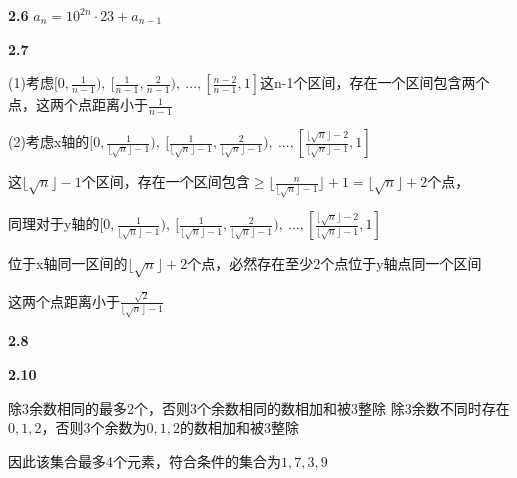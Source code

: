 \vspace{5mm} %
\noindent{}\textbf{2.6}
$a_n=10^{2n}\cdot23+a_{n-1}$

\vspace{5mm} %
\noindent{}\textbf{2.7}

(1)考虑$[0,\frac{1}{n-1}),\ [\frac{1}{n-1},\frac{2}{n-1}),\ ...,[\frac{n-2}{n-1},1]$这n-1个区间，存在一个区间包含两个点，这两个点距离小于$\frac{1}{n-1}$

(2)考虑x轴的$[0,\frac{1}{\lfloor\sqrt{n}\rfloor-1}),\ [\frac{1}{\lfloor\sqrt{n}\rfloor-1},\frac{2}{\lfloor\sqrt{n}\rfloor-1}),\ ...,[\frac{\lfloor\sqrt{n}\rfloor-2}{\lfloor\sqrt{n}\rfloor-1},1]$

这$\lfloor\sqrt{n}\rfloor-1$个区间，存在一个区间包含$\geq \lfloor\frac{n}{\lfloor\sqrt{n}\rfloor-1}\rfloor+1=\lfloor\sqrt{n}\rfloor+2$个点，

同理对于y轴的$[0,\frac{1}{\lfloor\sqrt{n}\rfloor-1}),\ [\frac{1}{\lfloor\sqrt{n}\rfloor-1},\frac{2}{\lfloor\sqrt{n}\rfloor-1}),\ ...,[\frac{\lfloor\sqrt{n}\rfloor-2}{\lfloor\sqrt{n}\rfloor-1},1]$

位于x轴同一区间的$\lfloor\sqrt{n}\rfloor+2$个点，必然存在至少2个点位于y轴点同一个区间

这两个点距离小于$\frac{\sqrt{2}}{\lfloor\sqrt{n}\rfloor-1}$


\vspace{5mm} %
\noindent{}\textbf{2.8}


\vspace{5mm} %
\noindent{}\textbf{2.10}

除3余数相同的最多2个，否则3个余数相同的数相加和被3整除
除3余数不同时存在$0,1,2$，否则3个余数为$0,1,2$的数相加和被3整除

因此该集合最多4个元素，符合条件的集合为${1,7,3,9}$
